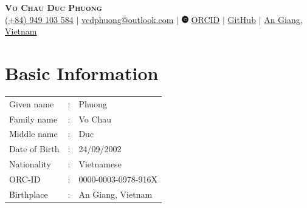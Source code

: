 \documentclass[letterpaper,11pt]{article}
\begin{document}
	
	
	\begin{center}
		\textbf{\Huge \scshape Vo Chau Duc Phuong} \\ \vspace{3pt}
		\small
		\faMobile \hspace{.5pt} \href{tel:84949103584}{(+84) 949 103 584}
		$|$
		\faAt \hspace{.5pt} \href{mailto:vcdphuong@outlook.com}{\color{blue}vcdphuong@outlook.com}
		$|$
		\includegraphics[width=0.3cm]{orcid-brands-solid.pdf} \href{https://orcid.org/my-orcid?orcid=0000-0003-0978-916X}{\color{blue}ORCID}
		$|$
		\faGithub \hspace{.5pt} \href{https://github.com/VCDPhuong}{\color{blue}GitHub}
		$|$
		\faMapMarker \hspace{.5pt} \href{https://maps.app.goo.gl/HEDTEgmndzQa4AyCA}{\color{blue}An Giang, Vietnam}
		
	\end{center}
	
	
	
\section{Basic Information}
\vspace{-0.5cm}
\begin{table}[!ht]
\hspace{0.5cm}	\begin{tabular}{l l l}
		Given name      & : \hspace{0.2cm}\null & Phuong              \\
		Family name   & :  & Vo Chau             \\
		Middle name   & :  & Duc                 \\
		Date of Birth \hspace{0.2cm}\null & :  & 24/09/2002          \\
		Nationality   & : & Vietnamese          \\
		ORC-ID        & :  & 0000-0003-0978-916X \\
		Birthplace & :  & An Giang, Vietnam 
		
	\end{tabular}
\end{table}
\vspace{-0.5cm}
\end{document}

